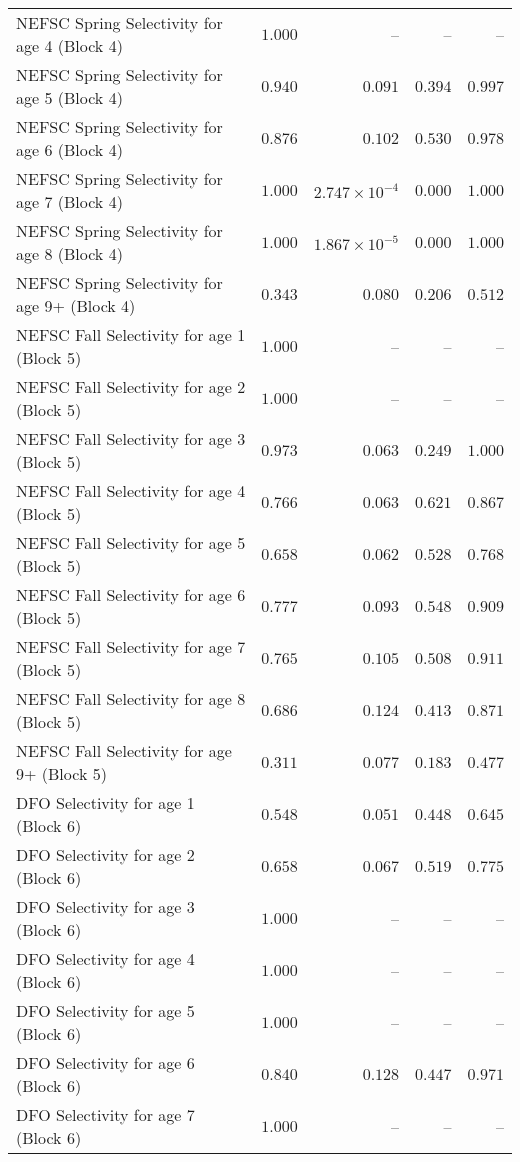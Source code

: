 \documentclass[
]{article}
\begin{document}
\begin{landscape}
\begin{longtable}[t]{lrrrr}
NEFSC Spring Selectivity for age 4 (Block 4) & $1.000$ & -- & -- & --\\
NEFSC Spring Selectivity for age 5 (Block 4) & $0.940$ & $0.091$ & $0.394$ & $0.997$\\
NEFSC Spring Selectivity for age 6 (Block 4) & $0.876$ & $0.102$ & $0.530$ & $0.978$\\
NEFSC Spring Selectivity for age 7 (Block 4) & $1.000$ & $2.747\times 10^{-4}$ & $0.000$ & $1.000$\\
\addlinespace
NEFSC Spring Selectivity for age 8 (Block 4) & $1.000$ & $1.867\times 10^{-5}$ & $0.000$ & $1.000$\\
NEFSC Spring Selectivity for age 9+ (Block 4) & $0.343$ & $0.080$ & $0.206$ & $0.512$\\
NEFSC Fall Selectivity for age 1 (Block 5) & $1.000$ & -- & -- & --\\
NEFSC Fall Selectivity for age 2 (Block 5) & $1.000$ & -- & -- & --\\
NEFSC Fall Selectivity for age 3 (Block 5) & $0.973$ & $0.063$ & $0.249$ & $1.000$\\
\addlinespace
NEFSC Fall Selectivity for age 4 (Block 5) & $0.766$ & $0.063$ & $0.621$ & $0.867$\\
NEFSC Fall Selectivity for age 5 (Block 5) & $0.658$ & $0.062$ & $0.528$ & $0.768$\\
NEFSC Fall Selectivity for age 6 (Block 5) & $0.777$ & $0.093$ & $0.548$ & $0.909$\\
NEFSC Fall Selectivity for age 7 (Block 5) & $0.765$ & $0.105$ & $0.508$ & $0.911$\\
NEFSC Fall Selectivity for age 8 (Block 5) & $0.686$ & $0.124$ & $0.413$ & $0.871$\\
\addlinespace
NEFSC Fall Selectivity for age 9+ (Block 5) & $0.311$ & $0.077$ & $0.183$ & $0.477$\\
DFO Selectivity for age 1 (Block 6) & $0.548$ & $0.051$ & $0.448$ & $0.645$\\
DFO Selectivity for age 2 (Block 6) & $0.658$ & $0.067$ & $0.519$ & $0.775$\\
DFO Selectivity for age 3 (Block 6) & $1.000$ & -- & -- & --\\
DFO Selectivity for age 4 (Block 6) & $1.000$ & -- & -- & --\\
\addlinespace
DFO Selectivity for age 5 (Block 6) & $1.000$ & -- & -- & --\\
DFO Selectivity for age 6 (Block 6) & $0.840$ & $0.128$ & $0.447$ & $0.971$\\
DFO Selectivity for age 7 (Block 6) & $1.000$ & -- & -- & --\\

\end{longtable}
\end{landscape}
\end{document}
